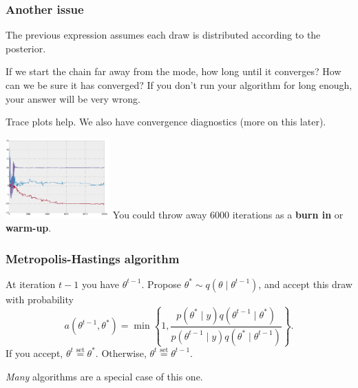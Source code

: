 \documentclass{beamer}
\begin{document}
\begin{frame}
\frametitle{Another issue}

The previous expression assumes each draw is distributed according to the posterior. 
\newline

If we start the chain far away from the mode, how long until it converges? How can we be sure it has converged? If you don't run your algorithm for long enough, your answer will be very wrong.
\newline
\pause

Trace plots help. We also have convergence diagnostics (more on this later).
\newline

\includegraphics[width=40mm]{convergence.png} You could throw away $6000$ iterations as a {\bf burn in} or {\bf warm-up}.

\end{frame}


\begin{frame}
\frametitle{Metropolis-Hastings algorithm}

At iteration $t-1$ you have $\theta^{t-1}$. Propose $\theta^* \sim q(\theta \mid \theta^{t-1})$, and accept this draw with probability 
$$
a(\theta^{t-1}, \theta^*) = \min\left\{1, \frac{p(\theta^* \mid y)q(\theta^{t-1} \mid \theta^*) }{p(\theta^{t-1} \mid y) q(\theta^* \mid \theta^{t-1}) }\right\}.
$$
If you accept, $\theta^t \overset{\text{set}}{=} \theta^*$. Otherwise, $\theta^t \overset{\text{set}}{=} \theta^{t-1}$. 
\newline

{\it Many} algorithms are a special case of this one.

\end{frame}
\end{document}
